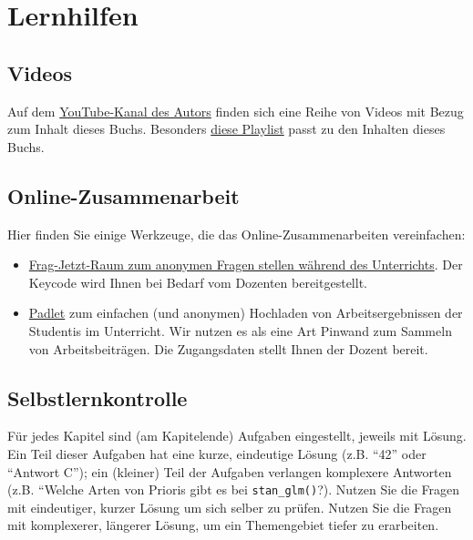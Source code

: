 \documentclass[
  a4paper,
  DIV=11]{scrreprt}
\providecommand{\tightlist}{%
  \setlength{\itemsep}{0pt}\setlength{\parskip}{0pt}}\usepackage{longtable,booktabs,array}
\theoremstyle{definition}
\theoremstyle{definition}
\theoremstyle{remark}
\begin{document}
\hypertarget{lernhilfen}{%
\section*{Lernhilfen}\label{lernhilfen}}


\hypertarget{videos}{%
\subsection*{Videos}\label{videos}}

Auf dem
\href{https://www.youtube.com/channel/UCkvdtj8maE7g-SOCh4aDB9g}{YouTube-Kanal
des Autors} finden sich eine Reihe von Videos mit Bezug zum Inhalt
dieses Buchs. Besonders
\href{https://youtube.com/playlist?list=PLRR4REmBgpIEzVFLvzCn76TB2VS4jXcfg}{diese
Playlist} passt zu den Inhalten dieses Buchs.

\hypertarget{online-zusammenarbeit}{%
\subsection*{Online-Zusammenarbeit}\label{online-zusammenarbeit}}

Hier finden Sie einige Werkzeuge, die das Online-Zusammenarbeiten
vereinfachen:

\begin{itemize}
\tightlist
\item
  \href{https://frag.jetzt/home}{Frag-Jetzt-Raum zum anonymen Fragen
  stellen während des Unterrichts}. Der Keycode wird Ihnen bei Bedarf
  vom Dozenten bereitgestellt.
\item
  \href{https://de.padlet.com/}{Padlet} zum einfachen (und anonymen)
  Hochladen von Arbeitsergebnissen der Studentis im Unterricht. Wir
  nutzen es als eine Art Pinwand zum Sammeln von Arbeitsbeiträgen. Die
  Zugangsdaten stellt Ihnen der Dozent bereit.
\end{itemize}

\hypertarget{selbstlernkontrolle}{%
\subsection*{Selbstlernkontrolle}\label{selbstlernkontrolle}}

Für jedes Kapitel sind (am Kapitelende) Aufgaben eingestellt, jeweils
mit Lösung. Ein Teil dieser Aufgaben hat eine kurze, eindeutige Lösung
(z.B. ``42'' oder ``Antwort C''); ein (kleiner) Teil der Aufgaben
verlangen komplexere Antworten (z.B. ``Welche Arten von Prioris gibt es
bei \texttt{stan\_glm()}?). Nutzen Sie die Fragen mit eindeutiger,
kurzer Lösung um sich selber zu prüfen. Nutzen Sie die Fragen mit
komplexerer, längerer Lösung, um ein Themengebiet tiefer zu erarbeiten.
\end{document}
